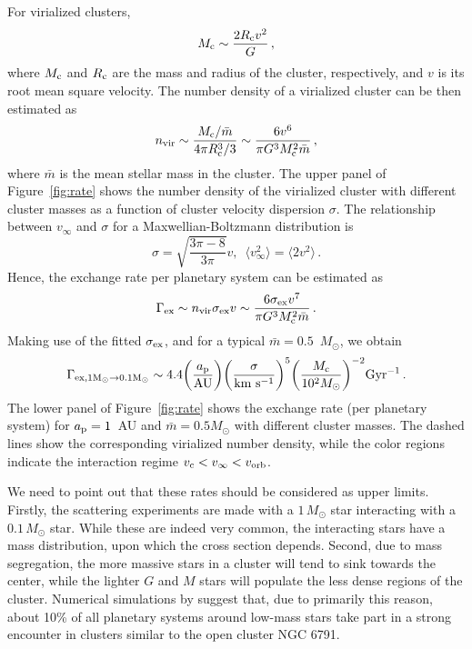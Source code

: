 \documentclass[twocolumn]{aastex62}
\begin{document}
For virialized clusters,
\begin{equation}
M_{\rm c}\sim \frac{2R_{\rm c}v^2}{G}\,,
\end{equation}
where $M_{\rm c}$ and $R_{\rm c}$ are the mass and radius of the cluster, respectively, and $v$ is its root mean square velocity. The number density of a virialized cluster can be then estimated as
\begin{equation}
n_{\rm vir}\sim\frac{M_{\rm c}/\bar{m}}{4\pi R_{\rm c}^3/3}\sim\frac{6v^6}{\pi G^3M_{\rm c}^2\bar{m}}\,,
\end{equation}
where $\bar{m}$ is the mean stellar mass in the cluster. The upper panel of Figure~\ref{fig:rate} shows the number density of the virialized cluster with different cluster masses as a function of cluster velocity dispersion $\sigma$. The relationship between $v_\infty$ and $\sigma$ for a Maxwellian-Boltzmann distribution is
\begin{equation}
\sigma=\sqrt{\frac{3\pi-8}{3\pi}}v,\,\,\,\langle v_\infty^2\rangle =\langle 2v^2 \rangle\,.
\end{equation}
Hence, the exchange rate per planetary system can be estimated as
\begin{equation}
\Gamma_{\rm ex} \sim n_{\rm vir}\sigma_{\rm ex} v \sim \frac{6\sigma_{\rm ex}v^7}{\pi G^3M_{\rm c}^2\bar{m}}\,.
\end{equation}
Making use of the fitted $\sigma_{\rm ex}$, and for a typical $\bar{m}=0.5$~$M_\odot$, we  obtain
\begin{equation}
\Gamma_{\rm ex,1M_\odot\rightarrow 0.1M_\odot}\sim 4.4\bigg(\frac{a_{\rm p}}{\rm AU} \bigg)\bigg(\frac{\sigma}{\rm km~s^{-1}}\bigg)^5 \bigg( \frac{M_{\rm c}}{10^2M_\odot}\bigg)^{-2}{\rm Gyr^{-1}}\,.
\end{equation}
The lower panel of Figure~\ref{fig:rate} shows the exchange rate (per planetary system) for $a_{\rm p}=1$~AU and $\bar{m}=0.5 M_\odot$ with different cluster masses. The dashed lines show the corresponding virialized number density, while the color regions indicate the interaction regime $v_{\rm c}<v_\infty<v_{\rm orb}$. 


We need to point out that these rates 
should be considered as upper limits. Firstly, the scattering experiments are made with a $1\,M_\odot$ star interacting with a $0.1\,M_\odot$ star.
While these are indeed very common, the interacting stars have a mass distribution, upon which the cross section depends.
Second, due to mass segregation, the more massive stars in a cluster will tend to sink towards the center, while the lighter $G$ and $M$ stars will populate the less dense regions of the cluster. Numerical simulations by \citet{Chatterjee2012} suggest that, due to primarily this reason, about 10\% of all planetary systems around low-mass stars take part in a strong encounter in clusters similar to the open cluster NGC 6791.
\end{document}
